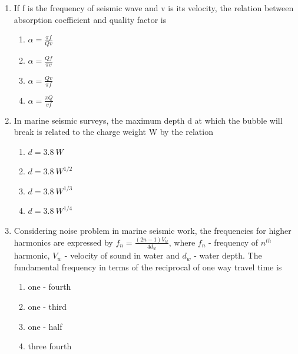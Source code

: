 \documentclass[journal,12pt,onecolumn]{IEEEtran}
\theoremstyle{remark}
\begin{document}
\begin{enumerate}
    \item If f is the frequency of seismic wave and v is its velocity, the relation between absorption coefficient \brak{\text{$\alpha$}} and quality factor  is

    \hfill{}
    
    \begin{multicols}{2}
        \begin{enumerate}
            \item $\alpha=\frac{\pi f}{Qv}$
            \item $\alpha=\frac{Qf}{\pi v}$
            \item $\alpha=\frac{Qv}{\pi f}$
            \item $\alpha=\frac{\pi Q}{vf}$
        \end{enumerate}
    \end{multicols}

    \item In marine seismic surveys, the maximum depth d  at which the bubble will break is related to the charge weight W  by the relation

    \hfill{}
    
    \begin{multicols}{2}
        \begin{enumerate}
            \item $d=3.8~W$
            \item $d=3.8~W^{1/2}$
            \item $d=3.8~W^{1/3}$
            \item $d=3.8~W^{1/4}$
        \end{enumerate}
    \end{multicols}

    \item Considering noise problem  in marine seismic work, the frequencies for higher harmonics are expressed by $f_{n}=\frac{(2n-1)V_{w}}{4d_{w}}$, where $f_{n}$ - frequency of $n^{th}$ harmonic, $V_{w}$ - velocity of sound in water and $d_{w}$ - water depth. The fundamental frequency in terms of the reciprocal of one way travel time is

    \hfill{}
    
    \begin{multicols}{2}
        \begin{enumerate}
            \item one - fourth
            \item one - third
            \item one - half
            \item three fourth
        \end{enumerate}
    \end{multicols}


\end{enumerate}
\end{document}
